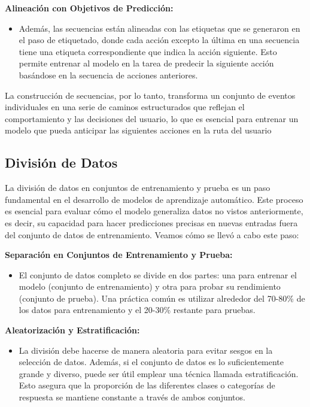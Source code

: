 \textbf{Alineación con Objetivos de Predicción:}

\begin{itemize}
    \item Además, las secuencias están alineadas con las etiquetas que se generaron en el paso de etiquetado, donde cada acción excepto la última en una secuencia tiene una etiqueta correspondiente que indica la acción siguiente. Esto permite entrenar al modelo en la tarea de predecir la siguiente acción basándose en la secuencia de acciones anteriores.
\end{itemize}

La construcción de secuencias, por lo tanto, transforma un conjunto de eventos individuales en una serie de caminos estructurados que reflejan el comportamiento y las decisiones del usuario, lo que es esencial para entrenar un modelo que pueda anticipar las siguientes acciones en la ruta del usuario

\subsection{División de Datos}

La división de datos en conjuntos de entrenamiento y prueba es un paso fundamental en el desarrollo de modelos de aprendizaje automático. Este proceso es esencial para evaluar cómo el modelo generaliza datos no vistos anteriormente, es decir, su capacidad para hacer predicciones precisas en nuevas entradas fuera del conjunto de datos de entrenamiento. Veamos cómo se llevó a cabo este paso:

\textbf{Separación en Conjuntos de Entrenamiento y Prueba:}

\begin{itemize}
    \item El conjunto de datos completo se divide en dos partes: una para entrenar el modelo (conjunto de entrenamiento) y otra para probar su rendimiento (conjunto de prueba). Una práctica común es utilizar alrededor del 70-80\% de los datos para entrenamiento y el 20-30\% restante para pruebas.
\end{itemize}

\textbf{Aleatorización y Estratificación:}

\begin{itemize}
    \item La división debe hacerse de manera aleatoria para evitar sesgos en la selección de datos. Además, si el conjunto de datos es lo suficientemente grande y diverso, puede ser útil emplear una técnica llamada estratificación. Esto asegura que la proporción de las diferentes clases o categorías de respuesta se mantiene constante a través de ambos conjuntos.
\end{itemize}

